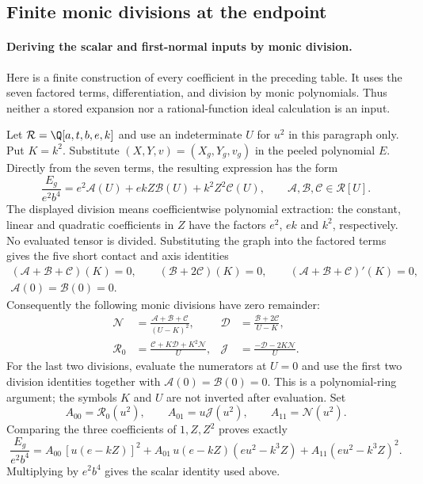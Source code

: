 \subsection{Finite monic divisions at the endpoint}

\label{component:p935c9d6318ea}
\paragraph{Deriving the scalar and first-normal inputs by monic division.}
Here is a finite construction of every coefficient in the preceding table. It uses the seven factored terms, differentiation, and division by monic polynomials. Thus neither a stored expansion nor a rational-function ideal calculation is an input.

Let $\mathcal R=\Q[a,t,b,e,k]$ and use an indeterminate $U$ for $u^2$ in this paragraph only. Put $K=k^2$. Substitute $(X,Y,v)=(X_g,Y_g,v_g)$ in the peeled polynomial $E$. Directly from the seven terms, the resulting expression has the form
\[
\frac{E_g}{e^2b^4}=e^2\mathcal A(U)+ekZ\mathcal B(U)+k^2Z^2\mathcal C(U),
\qquad \mathcal A,\mathcal B,\mathcal C\in\mathcal R[U].
\]
The displayed division means coefficientwise polynomial extraction: the constant, linear and quadratic coefficients in $Z$ have the factors $e^2$, $ek$ and $k^2$, respectively. No evaluated tensor is divided. Substituting the graph into the factored terms gives the five short contact and axis identities
\begin{gather*}
(\mathcal A+\mathcal B+\mathcal C)(K)=0,\qquad
(\mathcal B+2\mathcal C)(K)=0,\qquad
(\mathcal A+\mathcal B+\mathcal C)'(K)=0,\\
\mathcal A(0)=\mathcal B(0)=0.
\end{gather*}
Consequently the following monic divisions have zero remainder:
\begin{align*}
\mathcal N&=\frac{\mathcal A+\mathcal B+\mathcal C}{(U-K)^2},&
\mathcal D&=\frac{\mathcal B+2\mathcal C}{U-K},\\
\mathcal R_0&=\frac{\mathcal C+K\mathcal D+K^2\mathcal N}{U},&
\mathcal J&=\frac{-\mathcal D-2K\mathcal N}{U}.
\end{align*}
For the last two divisions, evaluate the numerators at $U=0$ and use the first two division identities together with $\mathcal A(0)=\mathcal B(0)=0$. This is a polynomial-ring argument; the symbols $K$ and $U$ are not inverted after evaluation. Set
\[
A_{00}=\mathcal R_0(u^2),\qquad A_{01}=u\mathcal J(u^2),
\qquad A_{11}=\mathcal N(u^2).
\]
Comparing the three coefficients of $1,Z,Z^2$ proves exactly
\[
\frac{E_g}{e^2b^4}
=A_{00}\,[u(e-kZ)]^2+A_{01}\,u(e-kZ)(eu^2-k^3Z)
 +A_{11}(eu^2-k^3Z)^2.
\]
Multiplying by $e^2b^4$ gives the scalar identity used above.


